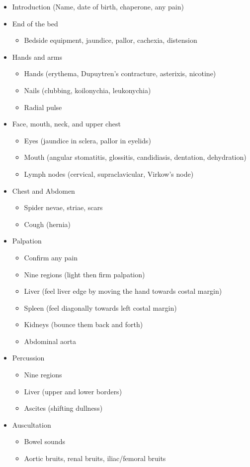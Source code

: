 \begin{itemize}
    \item Introduction (Name, date of birth, chaperone, any pain)
    \item End of the bed
    \begin{itemize}
        \item Bedside equipment, jaundice, pallor, cachexia, distension
    \end{itemize}
    \item Hands and arms
    \begin{itemize}
        \item Hands (erythema, Dupuytren's contracture, asterixis, nicotine)
        \item Nails (clubbing, koilonychia, leukonychia)
        \item Radial pulse
    \end{itemize}
    \item Face, mouth, neck, and upper chest
    \begin{itemize}
        \item Eyes (jaundice in sclera, pallor in eyelids)
        \item Mouth (angular stomatitis, glossitis, candidiasis, dentation, dehydration)
        \item Lymph nodes (cervical, supraclavicular, Virkow's node)
    \end{itemize}
    \item Chest and Abdomen
    \begin{itemize}
        \item Spider nevae, striae, scars
        \item Cough (hernia)
    \end{itemize}
    \item Palpation
    \begin{itemize}
        \item Confirm any pain
        \item Nine regions (light then firm palpation)
        \item Liver (feel liver edge by moving the hand towards costal margin)
        \item Spleen (feel diagonally towards left costal margin)
        \item Kidneys (bounce them back and forth)
        \item Abdominal aorta 
    \end{itemize}
    \item Percussion
    \begin{itemize}
        \item Nine regions
        \item Liver (upper and lower borders)
        \item Ascites (shifting dullness)
    \end{itemize}
    \item Auscultation
    \begin{itemize}
        \item Bowel sounds
        \item Aortic bruits, renal bruits, iliac/femoral bruits
    \end{itemize}
\end{itemize}

